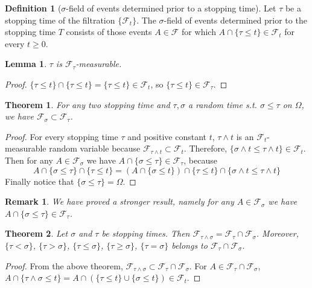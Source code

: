 \documentclass{article}
\newtheorem{Thm}{Theorem}[section]
\newtheorem{Lem}{Lemma}[section]
\newtheorem*{Rk}{Remark}
\theoremstyle{definition}
\newtheorem{Def}{Definition}[section]
\begin{document}
\begin{Def}[$\sigma$-field of events determined prior to a stopping time]
    Let $\tau$ be a stopping time of the filtration $\{\mathcal{F}_t\}$. The $\sigma$-field of events determined prior to the stopping time $T$
    consists of those events $A\in\mathcal{F}$ for which $A\cap\{\tau\le t\}\in \mathcal{F}_t$ for every $t\ge 0$.
\end{Def}
\begin{Lem}
    $\tau$ is $\mathcal{F}_\tau$-measurable.
\end{Lem}
\begin{proof}
    $\{\tau\le t\}\cap\{\tau\le t\}=\{\tau\le t\}\in\mathcal{F}_t$, so $\{\tau\le t\}\in \mathcal{F}_\tau$.
\end{proof}

\begin{Thm}
    For any two stopping time and $\tau,\sigma$ a random time s.t. $\sigma\le \tau$ on $\Omega$, we have $\mathcal{F}_\sigma\subset\mathcal{F}_\tau$.
\end{Thm}
\begin{proof}
    For every stopping time $\tau$ and positive constant $t$, $\tau\wedge t$ is an $\mathcal{F}_t$-measurable random variable
    because $\mathcal{F}_{\tau\wedge t}\subset\mathcal{F}_t$. Therefore, $\{\sigma\wedge t\le \tau\wedge t\}\in \mathcal{F}_t$.
    Then for any $A\in\mathcal{F}_\sigma$ we have $A\cap\{\sigma\le \tau\}\in\mathcal{F}_\tau$, because
    \[ A\cap\{\sigma\le \tau\}\cap \{\tau\le t\}= (A\cap \{\sigma\le t\})\cap \{\tau\le t\}\cap \{\sigma\wedge t\le \tau\wedge t\}\]
    Finally notice that $\{\sigma\le \tau\}=\Omega$.
\end{proof}
\begin{Rk}
    We have proved a stronger result, namely
    for any $A\in\mathcal{F}_\sigma$ we have $A\cap\{\sigma\le \tau\}\in\mathcal{F}_\tau$.
\end{Rk}
\begin{Thm}
    Let $\sigma$ and $\tau$ be stopping times. Then $\mathcal{F}_{\tau\wedge \sigma}=\mathcal{F}_\tau\cap\mathcal{F}_\sigma$.\newline 
    Moreover, $\{\tau<\sigma\}$, $\{\tau>\sigma\}$, $\{\tau\le \sigma\}$, $\{\tau\ge \sigma\}$, $\{\tau=\sigma\}$ belongs to $\mathcal{F}_\tau\cap\mathcal{F}_\sigma$.
\end{Thm}
\begin{proof}
    From the above theorem, $\mathcal{F}_{\tau\wedge \sigma}\subset \mathcal{F}_{\tau}\cap\mathcal{F}_\sigma$.\newline 
    For $A\in \mathcal{F}_{\tau}\cap\mathcal{F}_\sigma$, $A\cap \{\tau\wedge \sigma\le t\}=A\cap(\{\tau\le t\}\cup\{\sigma\le t\})\in\mathcal{F}_t$.
\end{proof}
\end{document}
